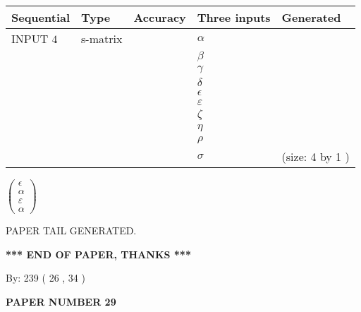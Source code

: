 \documentclass[12pt]{article}
\begin{document}
  
\noindent\begin{tabular}{|l|l|l|l|l|}
\hline
 Sequential & Type & Accuracy & Three inputs & Generated \\ 
\hline
 
 
  INPUT $  4 $ & s-matrix & & 
 $  \alpha $ & 
  \\
  & & & 
 $  \beta $ & 
  \\
  & & & 
 $  \gamma $ & 
  \\
  & & & 
 $  \delta $ & 
  \\
  & & & 
 $  \epsilon $ & 
  \\
  & & & 
 $  \varepsilon $ & 
  \\
  & & & 
 $                     \zeta $ & 
  \\
  & & & 
 $  \eta $ & 
  \\
  & & & 
 $  \rho $ & 
  \\
  & & & 
 $  \sigma $ & 
  (size:  4  by  1 )
 \\  \hline  
 \end{tabular}
   
   
 $  \left( \begin{array}
 {
 c
 }
 \epsilon \\ 
 \alpha \\ 
 \varepsilon \\ 
 \alpha
 \end{array} \right) $ 
   
   
   
   
 \vspace{0.2in}
 
   
   
\vspace{2.0in} PAPER TAIL GENERATED.
   
   
   
   
\vspace{1.0in} 
{\textbf{\large{ *** END OF PAPER, THANKS *** }}} 
   
   
\hspace{1.0in} By: 
 239 ( 26 ,  34 )
   
   
   
   
\newpage 
\setcounter{page}{ 
    29001 } 
   
   
   
   
 {\textbf{ \Large{ PAPER NUMBER  29  }}}
   
   
\vspace{0.2in}
   
   
   
\end{document}
